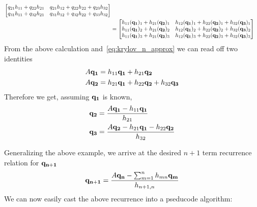 \begin{example}
\begin{align*}
\begin{bmatrix}
				q_{21}h_{11} + q_{22}h_{21} & q_{21}h_{12} + q_{22}h_{22} + q_{23}h_{32}\\
				q_{31}h_{11} + q_{32}h_{21} & q_{31}h_{12} + q_{32}h_{22}+ q_{33}h_{32}
			\end{bmatrix}\\		
			&=
			\begin{bmatrix}
				h_{11}(\vectorbold{q_1})_1 + h_{21}(\vectorbold{q_2})_1 & h_{12}(\vectorbold{q_1})_1 + h_{22}(\vectorbold{q_2})_1 + h_{32}(\vectorbold{q_3})_1 \\
				h_{11}(\vectorbold{q_1})_2 + h_{21}(\vectorbold{q_2})_2 & h_{12}(\vectorbold{q_1})_2 + h_{22}(\vectorbold{q_2})_2 + h_{32}(\vectorbold{q_3})_2 \\
				h_{11}(\vectorbold{q_1})_3 + h_{21}(\vectorbold{q_2})_3 & h_{12}(\vectorbold{q_1})_3 + h_{22}(\vectorbold{q_2})_3 + h_{32}(\vectorbold{q_3})_3
			\end{bmatrix}
	\end{align*}
	From the above calculation and~\ref{eq:krylov_n_approx} we can read off two identities
	\begin{align*}
		A\vectorbold{q_1} &= h_{11}\vectorbold{q_1}+h_{21}\vectorbold{q_2}\\
		A\vectorbold{q_2} &= h_{21}\vectorbold{q_1}+h_{22}\vectorbold{q_2} + h_{32}\vectorbold{q_3}
	\end{align*}
	Therefore we get, assuming \(\vectorbold{q_1}\) is known,
	\begin{align*}
		\vectorbold{q_2} &= \frac{A \vectorbold{q_1} - h_{11} \vectorbold{q_1}}{h_{21}}\\
		\vectorbold{q_3} &= \frac{A \vectorbold{q_2} - h_{21} \vectorbold{q_1} - h_{22}\vectorbold{q_2}}{h_{32}}
	\end{align*}
\end{example}
Generalizing the above example, we arrive at the desired \(n+1\) term recurrence relation for \(\vectorbold{q_{n+1}}\)
\begin{equation}
	\vectorbold{q_{n+1}} = \frac{A \vectorbold{q_n} - \sum_{m=1}^{n} h_{mn}\vectorbold{q_m}}{h_{n+1,n}}
	\label{eq:arnoldi_recurrence}
\end{equation}
We can now easily cast the above recurrence into a pseducode algorithm:
